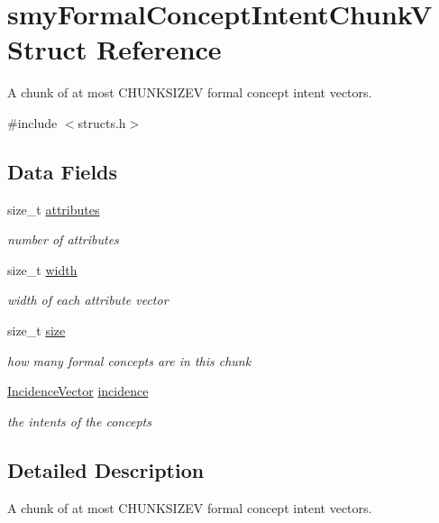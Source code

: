 \hypertarget{structsmyFormalConceptIntentChunkV}{\section{smy\-Formal\-Concept\-Intent\-Chunk\-V \-Struct \-Reference}
\label{structsmyFormalConceptIntentChunkV}
}


\-A chunk of at most \-C\-H\-U\-N\-K\-S\-I\-Z\-E\-V formal concept intent vectors.  




{\ttfamily \#include $<$structs.\-h$>$}

\subsection*{\-Data \-Fields}
\begin{DoxyCompactItemize}
\item 
size\-\_\-t \hyperlink{structsmyFormalConceptIntentChunkV_ab40281b9f96435442255be08563782c0}{attributes}
\begin{DoxyCompactList}\small\item\em number of attributes \end{DoxyCompactList}\item 
size\-\_\-t \hyperlink{structsmyFormalConceptIntentChunkV_a34213d18382955bee724884cd2bfd82c}{width}
\begin{DoxyCompactList}\small\item\em width of each attribute vector \end{DoxyCompactList}\item 
size\-\_\-t \hyperlink{structsmyFormalConceptIntentChunkV_acbb0ea8f58b4a13ecefc5a996c386206}{size}
\begin{DoxyCompactList}\small\item\em how many formal concepts are in this chunk \end{DoxyCompactList}\item 
\hyperlink{fca_8h_aae617489ac88fff15979050721fe581f}{\-Incidence\-Vector} \hyperlink{structsmyFormalConceptIntentChunkV_a12a126936dbafdf7ec85de7fed74eb8c}{incidence}
\begin{DoxyCompactList}\small\item\em the intents of the concepts \end{DoxyCompactList}\end{DoxyCompactItemize}


\subsection{\-Detailed \-Description}
\-A chunk of at most \-C\-H\-U\-N\-K\-S\-I\-Z\-E\-V formal concept intent vectors. 

